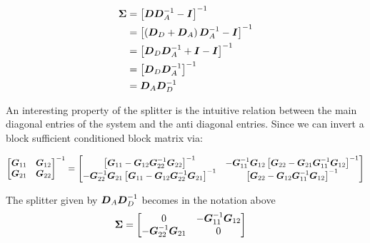 \begin{align*}
\begin{split}
\mbox{\boldmath$\Sigma$} &= \left[\mbox{\boldmath$D$}\mbox{\boldmath$D$}_A^{-1} - \mbox{\boldmath$I$}  \right]^{-1} \\
&= \left[\left(\mbox{\boldmath$D$}_D + \mbox{\boldmath$D$}_A\right)\mbox{\boldmath$D$}_A^{-1} - \mbox{\boldmath$I$}  \right]^{-1} \\
&= \left[\mbox{\boldmath$D$}_D \mbox{\boldmath$D$}_A^{-1} + \mbox{\boldmath$I$} - \mbox{\boldmath$I$}  \right]^{-1}\\
&= \left[\mbox{\boldmath$D$}_D \mbox{\boldmath$D$}_A^{-1}\right]^{-1}\\
&= \mbox{\boldmath$D$}_A \mbox{\boldmath$D$}_D^{-1}\\
\end{split}
\end{align*}


An interesting property of the splitter is the intuitive relation between the main diagonal entries of the system and the anti diagonal entries. Since we can invert a block sufficient conditioned block matrix via:

\begin{align}
\begin{split}
\begin{bmatrix}
\mbox{\boldmath$G$}_{11} & \mbox{\boldmath$G$}_{12} \\
\mbox{\boldmath$G$}_{21} & \mbox{\boldmath$G$}_{22} 
\end{bmatrix}^{-1} &= \begin{bmatrix}
\left[\mbox{\boldmath$G$}_{11} - \mbox{\boldmath$G$}_{12}\mbox{\boldmath$G$}_{22}^{-1}\mbox{\boldmath$G$}_{22}\right]^{-1} & -\mbox{\boldmath$G$}_{11}^{-1}\mbox{\boldmath$G$}_{12}\left[\mbox{\boldmath$G$}_{22} - \mbox{\boldmath$G$}_{21}\mbox{\boldmath$G$}_{11}^{-1}\mbox{\boldmath$G$}_{12}\right]^{-1}  \\
-\mbox{\boldmath$G$}_{22}^{-1}\mbox{\boldmath$G$}_{21}\left[\mbox{\boldmath$G$}_{11} - \mbox{\boldmath$G$}_{12}\mbox{\boldmath$G$}_{22}^{-1}\mbox{\boldmath$G$}_{21}\right]^{-1}  & \left[\mbox{\boldmath$G$}_{22} - \mbox{\boldmath$G$}_{12}\mbox{\boldmath$G$}_{11}^{-1}\mbox{\boldmath$G$}_{12}\right]^{-1} 
\end{bmatrix} \\
\end{split}
\end{align}

The splitter given by $\mbox{\boldmath$D$}_A\mbox{\boldmath$D$}_D^{-1}$ becomes in the notation above
\begin{align}
\begin{split}
\mbox{\boldmath$\Sigma$} &= \begin{bmatrix}
0 & -\mbox{\boldmath$G$}_{11}^{-1}\mbox{\boldmath$G$}_{12}\\
-\mbox{\boldmath$G$}_{22}^{-1}\mbox{\boldmath$G$}_{21}  & 0
\end{bmatrix}
\end{split}
\label{c:controller:e:EasySplitter}
\end{align}

